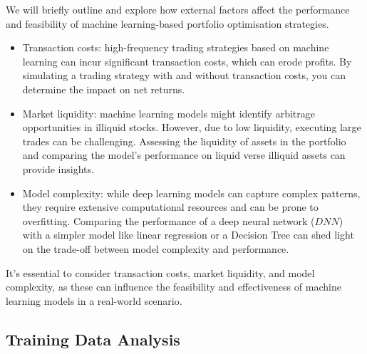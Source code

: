 \documentclass[a4paper,12pt,titlepage]{article}
\numberwithin{equation}{section}
\begin{document}
\begin{tcolorbox}[title=\textbf{Feasibility of $ML$-based Models}]

	We will briefly outline and explore how external factors affect the performance and feasibility of 
	machine learning-based portfolio optimisation strategies.
	
	\begin{itemize}

		\item Transaction costs: high-frequency trading strategies based on machine learning can incur significant 
			transaction costs, which can erode profits. By simulating a trading strategy with and without transaction costs, 
			you can determine the impact on net returns.
		
		\item Market liquidity: machine learning models might identify arbitrage opportunities in illiquid stocks. 
			However, due to low liquidity, executing large trades can be challenging. Assessing the liquidity of assets 
			in the portfolio and comparing the model's performance on liquid verse illiquid assets can provide insights.

		\item Model complexity: while deep learning models can capture complex patterns, they require extensive 
			computational resources and can be prone to overfitting. Comparing the performance of a deep neural network 
			($DNN$) with a simpler model like linear regression or a Decision Tree can shed light on the trade-off between model 
			complexity and performance.

	\end{itemize}

	It's essential to consider transaction costs, market liquidity, and model complexity, as these can influence the 
	feasibility and effectiveness of machine learning models in a real-world scenario.

\end{tcolorbox}

\subsection{Training Data Analysis}
\end{document}
